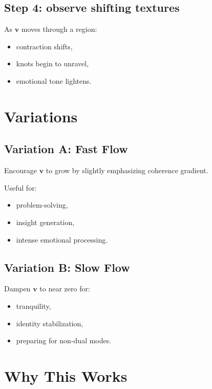 \documentclass[12pt]{article}
\begin{document}
\subsection*{Step 4: observe shifting textures}

As $\mathbf{v}$ moves through a region:

\begin{itemize}
    \item contraction shifts,
    \item knots begin to unravel,
    \item emotional tone lightens.
\end{itemize}

\section{Variations}

\subsection{Variation A: Fast Flow}

Encourage $\mathbf{v}$ to grow by slightly emphasizing coherence gradient.

Useful for:

\begin{itemize}
    \item problem-solving,
    \item insight generation,
    \item intense emotional processing.
\end{itemize}

\subsection{Variation B: Slow Flow}

Dampen $\mathbf{v}$ to near zero for:

\begin{itemize}
    \item tranquility,
    \item identity stabilization,
    \item preparing for non-dual modes.
\end{itemize}

\section{Why This Works}
\end{document}
